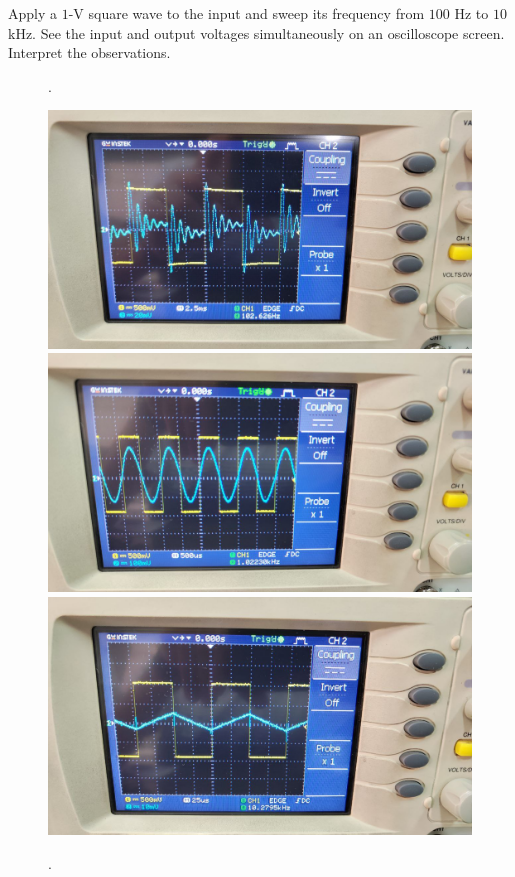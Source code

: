 \documentclass[11pt]{article}
\begin{document}
\begin{question}
\begin{subquestion}{Apply a $1$-V square wave to the input and sweep its frequency from $100$ Hz to $10$ kHz. See the input and output voltages simultaneously on an oscilloscope screen. Interpret the observations.}
{\begin{figure}[H]
                \caption{.}
            \end{figure}
            \begin{figure}[H]
                \centering
                \includegraphics[scale=0.1,angle=0]{Fig/25.jpeg}
                \includegraphics[scale=0.1,angle=0]{Fig/26.jpeg}
                \includegraphics[scale=0.1,angle=0]{Fig/27.jpeg}
                \caption{.}
            \end{figure}
        }
    \end{subquestion}

\end{question}
\end{document}
